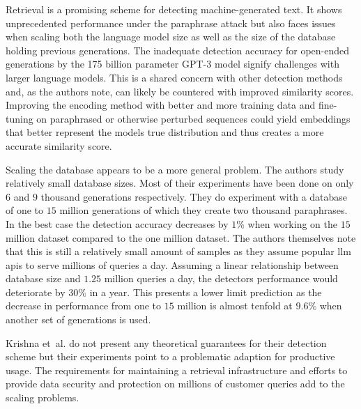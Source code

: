     \begin{remark}
        Retrieval is a promising scheme for detecting machine-generated text.
        It shows unprecedented performance under the paraphrase attack but also faces issues when scaling both the language model size as well as the size of the database holding previous generations.
        The inadequate detection accuracy for open-ended generations by the 175 billion parameter GPT-3 model signify challenges with larger language models.
        This is a shared concern with other detection methods and, as the authors note, can likely be countered with improved similarity scores.
        Improving the encoding method with better and more training data and fine-tuning on paraphrased or otherwise perturbed sequences could yield embeddings that better represent the models true distribution and thus creates a more accurate similarity score.

        Scaling the database appears to be a more general problem.
        The authors study relatively small database sizes.
        Most of their experiments have been done on only $6$ and $9$ thousand generations respectively.
        They do experiment with a database of one to $15$ million generations of which they create two thousand paraphrases.
        In the best case the detection accuracy decreases by $1\%$ when working on the $15$ million dataset compared to the one million dataset.
        The authors themselves note that this is still a relatively small amount of samples as they assume popular \ac{llm} \acp{api} to serve millions of queries a day.
        Assuming a linear relationship between database size and $1.25$ million queries a day, the detectors performance would deteriorate by $30\%$ in a year.
        This presents a lower limit prediction as the decrease in performance from one to $15$ million is almost tenfold at $9.6\%$ when another set of generations is used.

        Krishna et~al. \cite{krishna2023paraphrasing} do not present any theoretical guarantees for their detection scheme but their experiments point to a problematic adaption for productive usage.
        The requirements for maintaining a retrieval infrastructure and efforts to provide data security and protection on millions of customer queries add to the scaling problems. 
    \end{remark}

